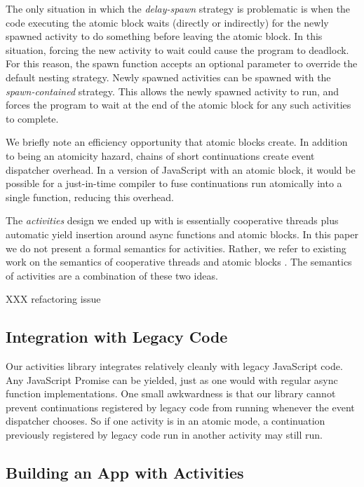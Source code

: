 \documentclass[acmsmall,anonymous,review]{acmart}\settopmatter{printfolios=true,printccs=false,printacmref=false}
\begin{document}
The only situation in which the \emph{delay-spawn} strategy is problematic is when the code executing the atomic block waits (directly or indirectly) for the newly spawned activity to do something before leaving the atomic block.
In this situation, forcing the new activity to wait could cause the program to deadlock.
For this reason, the spawn function accepts an optional parameter to override the default nesting strategy.
Newly spawned activities can be spawned with the \emph{spawn-contained} strategy.
This allows the newly spawned activity to run, and forces the program to wait at the end of the atomic block for any such activities to complete.

We briefly note an efficiency opportunity that atomic blocks create.
In addition to being an atomicity hazard, chains of short continuations create event dispatcher overhead.
In a version of JavaScript with an atomic block, it would be possible for a just-in-time compiler to fuse continuations run atomically into a single function, reducing this overhead.

The \emph{activities} design we ended up with is essentially cooperative threads plus automatic yield insertion around async functions and atomic blocks.
In this paper we do not present a formal semantics for activities.
Rather, we refer to existing work on the semantics of cooperative threads \cite{Abadi2009} and atomic blocks \cite{Moore2008}.
The semantics of activities are a combination of these two ideas.

XXX refactoring issue

\subsection{Integration with Legacy Code}

Our activities library integrates relatively cleanly with legacy JavaScript code.
Any JavaScript Promise can be yielded, just as one would with regular async function implementations.
One small awkwardness is that our library cannot prevent continuations registered by legacy code from running whenever the event dispatcher chooses.
So if one activity is in an atomic mode, a continuation previously registered by legacy code run in another activity may still run.

\subsection{Building an App with Activities}
\end{document}
